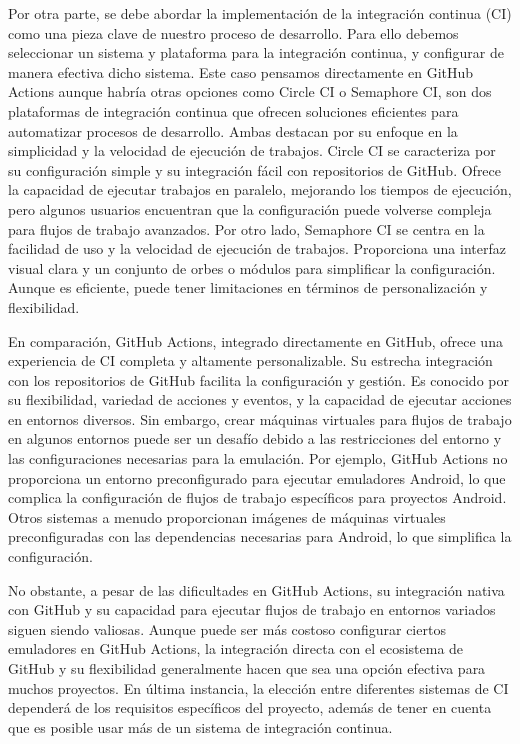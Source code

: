 Por otra parte, se debe abordar la implementación de la integración continua (CI) \cite{CI_supp} como una pieza 
clave de nuestro proceso de desarrollo. Para ello debemos seleccionar un sistema y plataforma para la integración 
continua, y configurar de manera efectiva dicho sistema. Este caso pensamos directamente en GitHub Actions aunque 
habría otras opciones como Circle CI o Semaphore CI, son dos plataformas de integración continua  que ofrecen 
soluciones eficientes para automatizar procesos de desarrollo. Ambas destacan por su enfoque en la simplicidad y la 
velocidad de ejecución de trabajos. Circle CI se caracteriza por su configuración simple y su integración fácil con 
repositorios de GitHub. Ofrece la capacidad de ejecutar trabajos en paralelo, mejorando los tiempos de ejecución, pero 
algunos usuarios encuentran que la configuración puede volverse compleja para flujos de trabajo avanzados. Por otro 
lado, Semaphore CI se centra en la facilidad de uso y la velocidad de ejecución de trabajos. Proporciona una interfaz 
visual clara y un conjunto de orbes o módulos para simplificar la configuración. Aunque es eficiente, puede tener 
limitaciones en términos de personalización y flexibilidad.

En comparación, GitHub Actions, integrado directamente en GitHub, ofrece una experiencia de CI completa y altamente 
personalizable. Su estrecha integración con los repositorios de GitHub facilita la configuración y gestión. Es 
conocido por su flexibilidad, variedad de acciones y eventos, y la capacidad de ejecutar acciones en entornos 
diversos. Sin embargo, crear máquinas virtuales para flujos de trabajo en algunos entornos puede ser un desafío debido 
a las restricciones del entorno y las configuraciones necesarias para la emulación. Por ejemplo, GitHub Actions no 
proporciona un entorno preconfigurado para ejecutar emuladores Android, lo que complica la configuración de flujos de 
trabajo específicos para proyectos Android. Otros sistemas a menudo proporcionan imágenes de máquinas virtuales 
preconfiguradas con las dependencias necesarias para Android, lo que simplifica la configuración.

No obstante, a pesar de las dificultades en GitHub Actions, su integración nativa con GitHub y su capacidad para 
ejecutar flujos de trabajo en entornos variados siguen siendo valiosas. Aunque puede ser más costoso configurar 
ciertos emuladores en GitHub Actions, la integración directa con el ecosistema de GitHub y su flexibilidad 
generalmente hacen que sea una opción efectiva para muchos proyectos. En última instancia, la elección entre 
diferentes sistemas de CI dependerá de los requisitos específicos del proyecto, además de tener en cuenta que es 
posible usar más de un sistema de integración continua.

